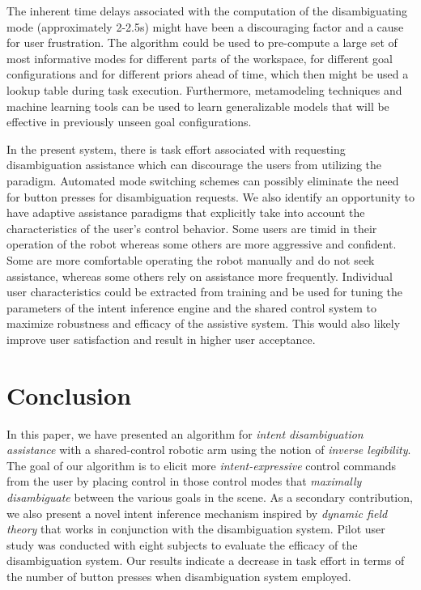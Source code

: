 \documentclass[natbib, twocolumn]{svjour3}          %
\begin{document}
 The inherent time delays associated with the computation of the disambiguating mode (approximately 2-2.5s) might have been a discouraging factor and a cause for user frustration. The algorithm could be used to pre-compute a large set of most informative modes for different parts of the workspace, for different goal configurations and for different priors ahead of time, which then might be used a lookup table during task execution. Furthermore, metamodeling techniques and machine learning tools can be used to learn generalizable models that will be effective in previously unseen goal configurations. 
 
 In the present system, there is task effort associated with requesting disambiguation assistance which can discourage the users from utilizing the paradigm. Automated mode switching schemes can possibly eliminate the need for button presses for disambiguation requests. 
 We also identify an opportunity to have adaptive assistance
 paradigms that explicitly take into account the characteristics of the user's control behavior. Some users are timid in their operation of the robot whereas some others are more aggressive and confident. Some are more comfortable operating the robot manually and do not seek assistance, whereas some others rely on assistance more frequently. Individual user characteristics could be extracted from training and be used for tuning the parameters of the intent inference engine and the shared control system to maximize robustness and efficacy of the assistive system. This would also likely improve user satisfaction and result in higher user acceptance.
  

\section{Conclusion}\label{sec:conclusions}
In this paper, we have presented an algorithm for \textit{intent disambiguation assistance} with a shared-control robotic arm using the notion of \textit{inverse legibility}. The goal of our algorithm is to elicit more \textit{intent-expressive} control commands from the user by placing control in those control modes that \textit{maximally disambiguate} between the various goals in the scene. As a secondary contribution, we also present a novel intent inference mechanism inspired by \textit{dynamic field theory} that works in conjunction with the disambiguation system. Pilot user study was conducted with eight subjects to evaluate the efficacy of the disambiguation system. Our results indicate a decrease in task effort in terms of the number of button presses when disambiguation system employed. 
\end{document}
